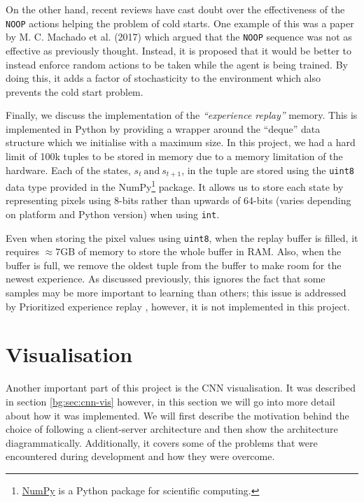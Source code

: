 On the other hand, recent reviews have cast doubt over the effectiveness of the \texttt{NOOP} actions helping the problem of cold starts. One example of this was a paper by M. C. Machado et al. (2017) \cite{machado2017revisiting} which argued that the \texttt{NOOP} sequence was not as effective as previously thought. Instead, it is proposed that it would be better to instead enforce random actions to be taken while the agent is being trained. By doing this, it adds a factor of stochasticity to the environment which also prevents the cold start problem.

Finally, we discuss the implementation of the \textit{``experience replay''} memory. This is implemented in Python by providing a wrapper around the ``deque'' data structure which we initialise with a maximum size. In this project, we had a hard limit of 100k tuples to be stored in memory due to a memory limitation of the hardware. Each of the states, $s_t~\text{and}~s_{t + 1}$, in the tuple are stored using the \texttt{uint8} data type provided in the NumPy\footnote{\href{https://numpy.org/}{NumPy} is a Python package for scientific computing.} package. It allows us to store each state by representing pixels using 8-bits rather than upwards of 64-bits (varies depending on platform and Python version) when using \texttt{int}.

Even when storing the pixel values using \texttt{uint8}, when the replay buffer is filled, it requires $\approx 7 \text{GB}$ of memory to store the whole buffer in RAM. Also, when the buffer is full, we remove the oldest tuple from the buffer to make room for the newest experience. As discussed previously, this ignores the fact that some samples may be more important to learning than others; this issue is addressed by Prioritized experience replay \cite{per}, however, it is not implemented in this project.

\section{Visualisation}

Another important part of this project is the CNN visualisation. It was described in section \ref{bg:sec:cnn-vis} however, in this section we will go into more detail about how it was implemented. We will first describe the motivation behind the choice of following a client-server architecture and then show the architecture diagrammatically. Additionally, it covers some of the problems that were encountered during development and how they were overcome.

